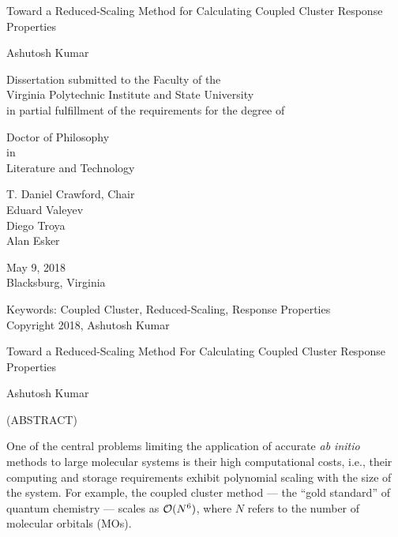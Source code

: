 \documentclass[12pt]{report}
\begin{document}
\thispagestyle{empty}
\begin{center}

{\Large 
Toward a Reduced-Scaling Method for Calculating Coupled Cluster Response Properties
}

\vfill

Ashutosh Kumar

\vfill

Dissertation submitted to the Faculty of the \\
Virginia Polytechnic Institute and State University \\
in partial fulfillment of the requirements for the degree of

\vfill

Doctor of Philosophy \\
in \\
Literature and Technology

\vfill

T. Daniel Crawford, Chair \\
Eduard Valeyev \\
Diego Troya \\
Alan Esker

\vfill

May 9, 2018 \\
Blacksburg, Virginia

\vfill

Keywords: Coupled Cluster, Reduced-Scaling, Response Properties
\\
Copyright 2018, Ashutosh Kumar

\end{center}

\pagebreak

\thispagestyle{empty}
\begin{center}

{\large 
Toward a Reduced-Scaling Method For Calculating Coupled Cluster Response Properties
}

\vfill

Ashutosh Kumar

\vfill

(ABSTRACT)

\vfill

\end{center}
One of the central problems limiting the application of accurate {\em ab
initio} methods to large molecular systems is their high computational costs,
i.e., their computing and storage requirements exhibit polynomial scaling with
the size of the system.  For example, the coupled cluster method --- the
``gold standard'' of quantum chemistry --- scales as ${\cal O}(N^6)$, where
$N$ refers to the number of molecular orbitals (MOs). 
\end{document}
